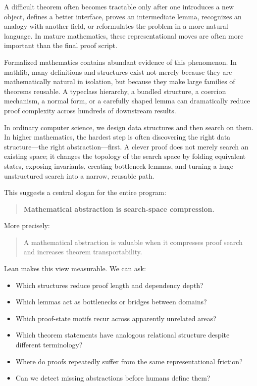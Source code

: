 \documentclass[12pt, a4paper]{article}
\begin{document}
A difficult theorem often becomes tractable only after one introduces a new
object, defines a better interface, proves an intermediate lemma, recognizes
an analogy with another field, or reformulates the problem in a more natural
language. In mature mathematics, these representational moves are often more
important than the final proof script.

Formalized mathematics contains abundant evidence of this phenomenon. In
mathlib, many definitions and structures exist not merely because they are
mathematically natural in isolation, but because they make large families of
theorems reusable. A typeclass hierarchy, a bundled structure, a coercion
mechanism, a normal form, or a carefully shaped lemma can dramatically reduce
proof complexity across hundreds of downstream results.

In ordinary computer science, we design data structures and then search on
them. In higher mathematics, the hardest step is often discovering the right
data structure---the right abstraction---first. A clever proof does not merely
search an existing space; it changes the topology of the search space by
folding equivalent states, exposing invariants, creating bottleneck lemmas,
and turning a huge unstructured search into a narrow, reusable path.

This suggests a central slogan for the entire program:

\begin{quote}
\textbf{Mathematical abstraction is search-space compression.}
\end{quote}

More precisely:

\begin{quote}
A mathematical abstraction is valuable when it compresses proof search and
increases theorem transportability.
\end{quote}

Lean makes this view measurable. We can ask:
\begin{itemize}[leftmargin=1.5em]
  \item Which structures reduce proof length and dependency depth?
  \item Which lemmas act as bottlenecks or bridges between domains?
  \item Which proof-state motifs recur across apparently unrelated areas?
  \item Which theorem statements have analogous relational structure despite
        different terminology?
  \item Where do proofs repeatedly suffer from the same representational
        friction?
  \item Can we detect missing abstractions before humans define them?
\end{itemize}
\end{document}
